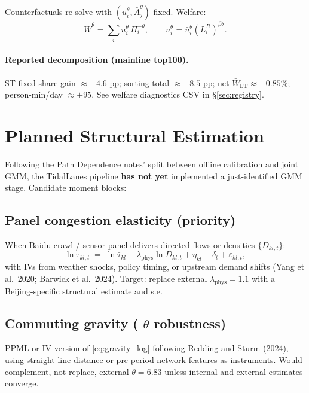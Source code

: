 \documentclass[11pt]{article}
\newcommand{\Wbar}{\bar W}
\newcommand{\ubar}{\bar u}
\newcommand{\Abar}{\bar A}
\newcommand{\phys}{\mathrm{phys}}
\begin{document}
Counterfactuals re-solve with $(\ubar_i^{\theta},\Abar_j^{\theta})$
fixed.  Welfare:
\begin{equation}
  \Wbar^{\theta} = \sum_i u_i^{\theta}\,\Pi_i^{-\theta},
  \qquad
  u_i^{\theta} = \ubar_i^{\theta}(L_i^R)^{\beta\theta}.
\end{equation}

\paragraph{Reported decomposition (mainline top100).}
ST fixed-share gain $\approx +4.6$ pp; sorting total $\approx -8.5$ pp;
net $\Wbar_{\mathrm{LT}}\approx -0.85\%$; person-min/day $\approx +95$.
See welfare diagnostics CSV in \S\ref{sec:registry}.

\section{Planned Structural Estimation}\label{sec:planned}

Following the Path Dependence notes' split between offline calibration
and joint GMM, the TidalLanes pipeline \textbf{has not yet} implemented
a just-identified GMM stage.  Candidate moment blocks:

\subsection{Panel congestion elasticity (priority)}

When Baidu crawl / sensor panel delivers directed flows or densities
$\{D_{kl,t}\}$:
\begin{equation}
  \ln \tau_{kl,t}
  \;=\;
  \ln\bar\tau_{kl}
  + \lambda_{\phys}\ln D_{kl,t}
  + \eta_{kl} + \delta_t + \varepsilon_{kl,t},
\end{equation}
with IVs from weather shocks, policy timing, or upstream demand shifts
(Yang et al.\ 2020; Barwick et al.\ 2024).  Target: replace external
$\lambda_{\phys}=1.1$ with a Beijing-specific structural estimate and
s.e.

\subsection{Commuting gravity ( $\theta$ robustness)}

PPML or IV version of \eqref{eq:gravity_log} following Redding and Sturm
(2024), using straight-line distance or pre-period network features as
instruments.  Would complement, not replace, external $\theta=6.83$ unless
internal and external estimates converge.
\end{document}
